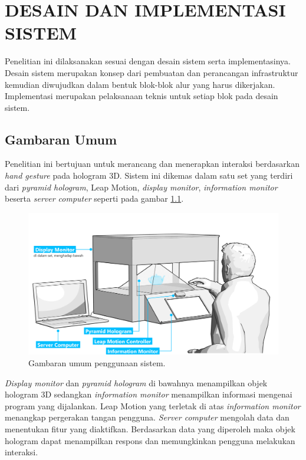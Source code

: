\chapter{DESAIN DAN IMPLEMENTASI SISTEM}
\vspace{4ex}

\hspace{\parindent} Penelitian ini dilaksanakan sesuai dengan desain sistem serta implementasinya. Desain sistem merupakan konsep dari pembuatan dan perancangan infrastruktur kemudian diwujudkan dalam bentuk blok-blok alur yang harus dikerjakan. Implementasi merupakan pelaksanaan teknis untuk setiap blok pada desain sistem.
\vspace{2ex}

\section{Gambaran Umum}
\vspace{1ex}
	Penelitian ini bertujuan untuk merancang dan menerapkan interaksi berdasarkan \textit{hand gesture} pada hologram 3D. Sistem ini dikemas dalam satu set yang terdiri dari \textit{pyramid hologram}, Leap Motion, \textit{display monitor}, \textit{information monitor} beserta \textit{server computer} seperti pada gambar \ref{fig:cara_kerja}.
	\begin{figure} [H]
		\includegraphics[width=\textwidth]{img/bab3/cara_kerja.png}
		\caption{Gambaran umum penggunaan sistem.}
		\label{fig:cara_kerja}
	\end{figure}
	\textit{Display monitor} dan \textit{pyramid hologram} di bawahnya menampilkan objek hologram 3D sedangkan \textit{information monitor} menampilkan informasi mengenai program yang dijalankan. Leap Motion yang terletak di atas \textit{information monitor} menangkap pergerakan tangan pengguna. \textit{Server computer}  mengolah data dan menentukan fitur yang diaktifkan. Berdasarkan data yang diperoleh maka objek hologram dapat menampilkan respons dan memungkinkan pengguna melakukan interaksi.
\vspace{2ex}

